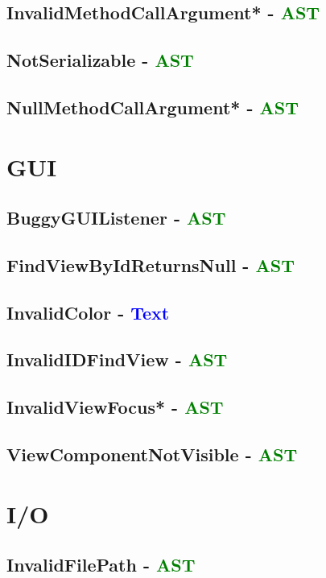 \subsection{InvalidMethodCallArgument* - \textcolor{green}{AST}}
\subsection{NotSerializable - \textcolor{green}{AST}}
\subsection{NullMethodCallArgument* - \textcolor{green}{AST}}

\section{GUI}
\subsection{BuggyGUIListener - \textcolor{green}{AST}}
\subsection{FindViewByIdReturnsNull - \textcolor{green}{AST}}
\subsection{InvalidColor - \textcolor{blue}{Text}}
\subsection{InvalidIDFindView - \textcolor{green}{AST}}
\subsection{InvalidViewFocus* - \textcolor{green}{AST}}
\subsection{ViewComponentNotVisible - \textcolor{green}{AST}}

\section{I/O}
\subsection{InvalidFilePath - \textcolor{green}{AST}}
